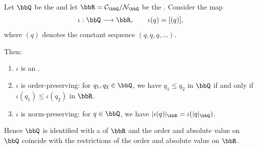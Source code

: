 \begin{proposition} \label{proposition:rational_numbers_embed_into_real_numbers}
    Let $\bbQ$ be the  and let $\bbR = \mathcal{C}_\bbQ / \mathcal{N}_\bbQ$ be the . Consider the map
    $$\iota: \bbQ \longrightarrow \bbR, \qquad \iota(q) = [(q)],$$
    where $(q)$ denotes the constant sequence $(q, q, q, \dots)$.

    Then:
    \begin{enumerate}
        \item $\iota$ is an  .
        \item $\iota$ is order-preserving: for $q_1, q_2 \in \bbQ$, we have $q_1 \le q_2$ in $\bbQ$ if and only if $\iota(q_1) \le \iota(q_2)$ in $\bbR$.
        \item $\iota$ is norm-preserving: for $q \in \bbQ$, we have $|\iota(q)|_\bbR = \iota(|q|_\bbQ)$.
    \end{enumerate}
    Hence $\bbQ$ is identified with a  of $\bbR$ and the order and absolute value on $\bbQ$ coincide with the restrictions of the order and absolute value on $\bbR$.
\end{proposition}

